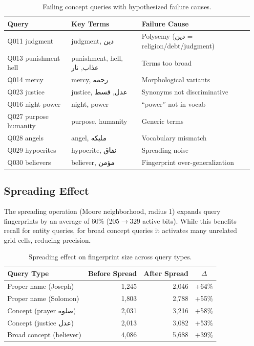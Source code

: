 \documentclass[conference]{IEEEtran}
\begin{document}
\begin{table}[t]
  \centering
  \caption{Failing concept queries with hypothesized failure causes.}
  \label{tab:failure}
  \footnotesize
  \begin{tabular}{lll}
    \toprule
    \textbf{Query} & \textbf{Key Terms} & \textbf{Failure Cause} \\
    \midrule
    Q011 judgment & judgment, دين & Polysemy (دين = religion/debt/judgment) \\
    Q013 punishment hell & punishment, hell, عذاب, نار & Terms too broad \\
    Q014 mercy & mercy, رحمه & Morphological variants \\
    Q023 justice & justice, عدل, قسط & Synonyms not discriminative \\
    Q016 night power & night, power & ``power'' not in vocab \\
    Q027 purpose humanity & purpose, humanity & Generic terms \\
    Q028 angels & angel, مليكه & Vocabulary mismatch \\
    Q029 hypocrites & hypocrite, نفاق & Spreading noise \\
    Q030 believers & believer, مؤمن & Fingerprint over-generalization \\
    \bottomrule
  \end{tabular}
\end{table}

\subsection{Spreading Effect}

The spreading operation (Moore neighborhood, radius 1) expands query
fingerprints by an average of 60\% (205$\to$329 active bits). While this
benefits recall for entity queries, for broad concept queries it
activates many unrelated grid cells, reducing precision.

\begin{table}[t]
  \centering
  \caption{Spreading effect on fingerprint size across query types.}
  \label{tab:spreading}
  \footnotesize
  \begin{tabular}{lrrc}
    \toprule
    \textbf{Query Type} &
    \textbf{Before Spread} &
    \textbf{After Spread} &
    $\Delta$ \\
    \midrule
    Proper name (Joseph) & 1,245 & 2,046 & +64\% \\
    Proper name (Solomon) & 1,803 & 2,788 & +55\% \\
    Concept (prayer صلوه) & 2,031 & 3,216 & +58\% \\
    Concept (justice عدل) & 2,013 & 3,082 & +53\% \\
    Broad concept (believer) & 4,086 & 5,688 & +39\% \\
    \bottomrule
  \end{tabular}
\end{table}
\end{document}
